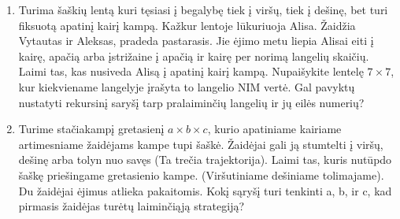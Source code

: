 \begin{enumerate}

  \item Turima šaškių lentą kuri tęsiasi į begalybę tiek į viršų, tiek į dešinę,
    bet turi fiksuotą apatinį kairį kampą. Kažkur lentoje lūkuriuoja Alisa.
    Žaidžia Vytautas ir Aleksas, pradeda pastarasis. Jie ėjimo metu liepia Alisai
    eiti į kairę, apačią arba įstrižaine į apačią ir kairę per norimą langelių
    skaičių. Laimi tas, kas nusiveda Alisą į apatinį kairį kampą. Nupaišykite
    lentelę $7\times 7$, kur kiekviename langelyje įrašyta to langelio NIM vertė.
    Gal pavyktų nustatyti rekursinį saryšį tarp pralaiminčių langelių ir jų eilės
    numerių? 

  \item Turime stačiakampį gretasienį  $a\times b\times c$, kurio apatiniame
    kairiame artimesniame žaidėjams kampe tupi šaškė. Žaidėjai gali ją stumtelti
    į viršų, dešinę arba tolyn nuo savęs (Ta trečia trajektorija). Laimi tas,
    kuris nutūpdo šaškę priešingame gretasienio kampe. (Viršutiniame dešiniame
    tolimajame). Du žaidėjai ėjimus atlieka pakaitomis. Kokį sąryšį turi tenkinti
    a, b, ir c, kad pirmasis žaidėjas turėtų laiminčiąją strategiją?


\end{enumerate}
